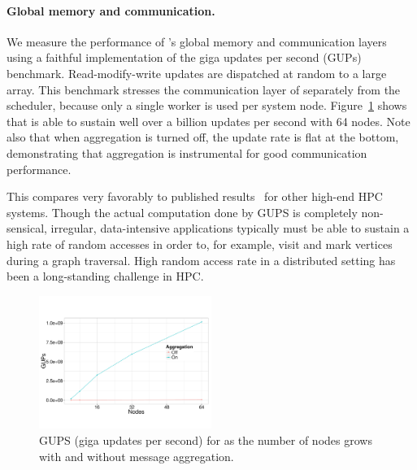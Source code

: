 \paragraph{Global memory and communication.} We measure the performance of
\Grappa's global memory and communication layers using a faithful
implementation of the giga updates per second (GUPs) benchmark.
Read-modify-write updates are dispatched at random to a large array. This
benchmark stresses the communication layer of \Grappa separately from the
scheduler, because only a single worker is used per system node.
Figure~\ref{fig:grappa-gups} shows that \Grappa is able to sustain well over a
billion updates per second with 64 nodes. Note also that when aggregation is turned off, the update rate is flat at the bottom, demonstrating that aggregation is instrumental for good communication performance.

This compares very favorably to published results~\cite{gups} for other
high-end HPC systems. Though the actual computation done by GUPS is completely
non-sensical, irregular, data-intensive applications typically must be able to
sustain a high rate of random accesses in order to, for example, visit and
mark vertices during a graph traversal. High random access rate in a
distributed setting has been a long-standing challenge in HPC.

\begin{figure}[ht]
    \begin{center}
      \includegraphics[width=0.5\textwidth]{figs/gups.pdf}
    \end{center}
    \caption{GUPS (giga updates per second) for \Grappa as the number of nodes grows with and without message aggregation.}
    \label{fig:grappa-gups}
\end{figure}

